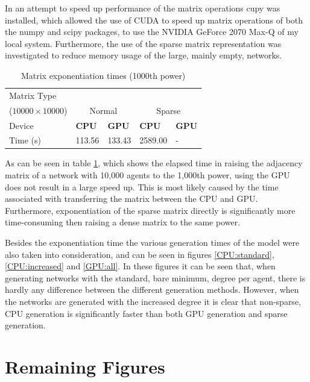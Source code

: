 \documentclass{article}
\begin{document}
In an  attempt to speed up performance of the matrix operations cupy was installed, which allowed the use of CUDA to speed up matrix operations of both the numpy and scipy packages, to use the NVIDIA GeForce 2070 Max-Q of my local system. Furthermore, the use of the sparse matrix representation was investigated to reduce memory usage of the large, mainly empty, networks.

\begin{table}[H]
    \centering
    \begin{tabular}{lllll}
        \toprule
        Matrix Type\\ ($10000 \times 10000$) & \multicolumn{2}{c}{Normal} & \multicolumn{2}{c}{Sparse}\\
        \midrule 
        Device &\textbf{CPU} & \textbf{GPU} & \textbf{CPU} & \textbf{GPU} \\
        \midrule
        Time (s) & 113.56 & 133.43 & 2589.00 & - \\
        \bottomrule
    \end{tabular}
    \label{table:exp_time}
    \caption{Matrix exponentiation times (1000th power)}
\end{table}

As can be seen in table \ref{table:exp_time}, which shows the elapsed time in raising the adjacency matrix of a network with 10,000 agents to the 1,000th power, using the GPU does not result in a large speed up. This is most likely caused by the time associated with transferring the matrix between the CPU and GPU. Furthermore, exponentiation of the sparse matrix directly is significantly more time-consuming then raising a dense matrix to the same power.

Besides the exponentiation time the various generation times of the model were also taken into consideration, and can be seen in figures \ref{CPU:standard}, \ref{CPU:increased} and \ref{GPU:all}.
In these figures it can be seen that, when generating networks with the standard, bare minimum, degree per agent, there is hardly any difference between the different generation methods. However, when the networks are generated with the increased degree it is clear that non-sparse, CPU generation is significantly faster than both GPU generation and sparse generation.

\newpage

\section{Remaining Figures}
\end{document}
